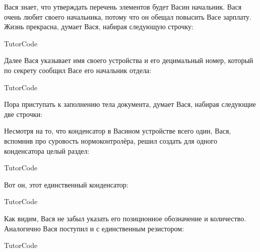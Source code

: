 Вася знает, что утверждать перечень элементов будет Васин начальник. Вася очень
любит своего начальника, потому что он обещал повысить Васе зарплату. Жизнь
прекрасна, думает Вася, набирая следующую строчку:

\begin{SaveVerbatim}{TutorCode}
\end{SaveVerbatim}
\colorbox{codecolor}{}

Далее Вася указывает имя своего устройства и его децимальный номер, который
по секрету сообщил Васе его начальник отдела:

\begin{SaveVerbatim}{TutorCode}
\end{SaveVerbatim}
\colorbox{codecolor}{}

Пора приступать к заполнению тела документа, думает Вася, набирая следующие
две строчки:

\colorbox{codecolor}{}

Несмотря на то, что конденсатор в Васином устройстве всего один, Вася, вспомнив
про суровость нормоконтролёра,  решил создать для одного конденсатора целый
раздел:

\begin{SaveVerbatim}{TutorCode}
\end{SaveVerbatim}
\colorbox{codecolor}{}

Вот он, этот единственный конденсатор:

\begin{SaveVerbatim}{TutorCode}
\end{SaveVerbatim}
\colorbox{codecolor}{}

Как видим, Вася не забыл указать его позиционное обозначение и
количество. Аналогично Вася поступил и с единственным резистором:

\begin{SaveVerbatim}{TutorCode}
\end{SaveVerbatim}
\colorbox{codecolor}{}

